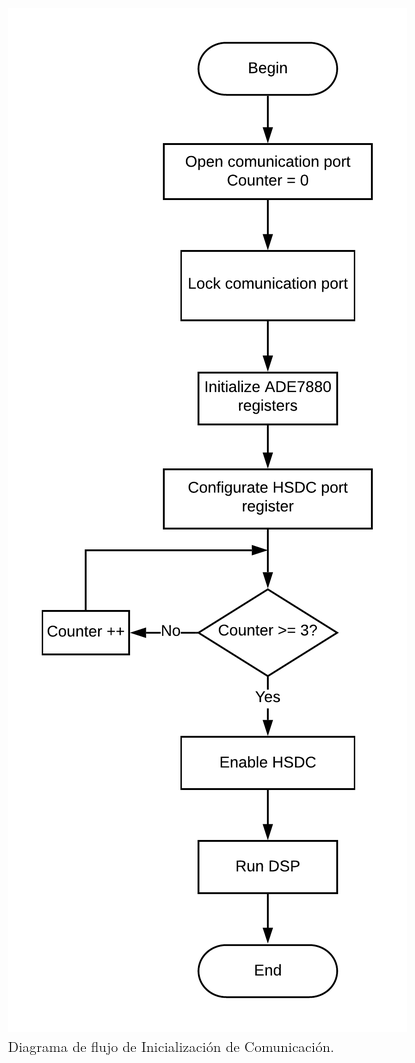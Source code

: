 \documentclass[letterpaper,12pt,oneside]{book}
\begin{document}
			\begin{figure}[!htpb]
				\centering
				\includegraphics[scale = 0.8]{Material de Consulta/Diagrama de Flujo Comunicacion.PNG}
				\caption[Inicialización de Comunicación]{Diagrama de flujo de Inicialización de Comunicación.}
				\label{DFConCom}
			\end{figure}
\end{document}
